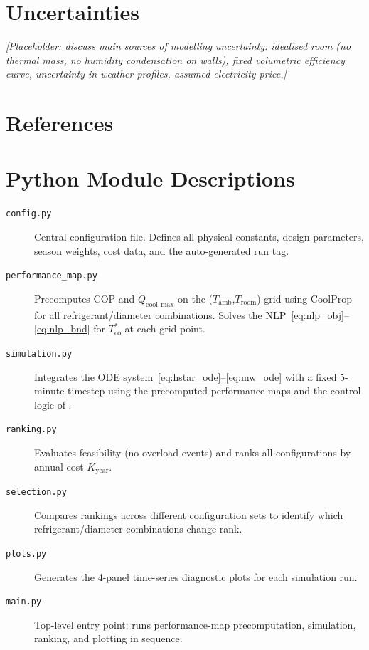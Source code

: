\documentclass[12pt, a4paper]{article}
\newcommand{\Qdot}{\dot{Q}}
\newcommand{\Tco}{T_{\mathrm{co}}}
\newcommand{\Tamb}{T_{\mathrm{amb}}}
\newcommand{\Troom}{T_{\mathrm{room}}}
\begin{document}
\section{Uncertainties}
\label{sec:uncertainty}

\textit{[Placeholder: discuss main sources of modelling uncertainty: idealised room
(no thermal mass, no humidity condensation on walls), fixed volumetric efficiency
curve, uncertainty in weather profiles, assumed electricity price.]}

\section{References}
\label{sec:refs}

\printbibliography[heading=none]

\section{Python Module Descriptions}
\label{sec:modules}

\begin{description}
  \item[\texttt{config.py}]
    Central configuration file. Defines all physical constants, design parameters,
    season weights, cost data, and the auto-generated run tag.
  \item[\texttt{performance\_map.py}]
    Precomputes COP and $\Qdot_{\mathrm{cool,max}}$ on the ($\Tamb$,$\Troom$) grid
    using CoolProp for all refrigerant/diameter combinations.
    Solves the NLP~\eqref{eq:nlp_obj}--\eqref{eq:nlp_bnd} for $\Tco^*$ at each grid
    point.
  \item[\texttt{simulation.py}]
    Integrates the ODE system~\eqref{eq:hstar_ode}--\eqref{eq:mw_ode} with a fixed
    5-minute timestep using the precomputed performance maps and the control logic of
    .
  \item[\texttt{ranking.py}]
    Evaluates feasibility (no overload events) and ranks all configurations by annual
    cost $K_{\mathrm{year}}$.
  \item[\texttt{selection.py}]
    Compares rankings across different configuration sets to identify which
    refrigerant/diameter combinations change rank.
  \item[\texttt{plots.py}]
    Generates the 4-panel time-series diagnostic plots for each simulation run.
  \item[\texttt{main.py}]
    Top-level entry point: runs performance-map precomputation, simulation, ranking,
    and plotting in sequence.
\end{description}
\end{document}
